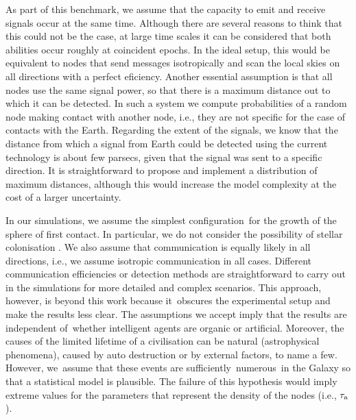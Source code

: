 \documentclass[crop]{CSLB}
\newcommand{\cetis}{nodes}
\begin{document}
As part of this benchmark, we assume that the capacity to emit and receive
signals occur at the same time.
%
Although there are several reasons to think that this could not be the case, at
large time scales it can be considered that both abilities occur roughly at
coincident epochs.
%
In the ideal setup, this would be equivalent to nodes that send messages
isotropically and scan the local skies on all directions with a perfect
eficiency.
%
Another essential assumption is that all \cetis{} use the same signal power, so
that there is a maximum distance out to which it can be detected.
%
In such a system we compute probabilities of a random node making contact with
another node, i.e., they are not specific for the case of contacts with the
Earth.
%
Regarding the extent of the signals, we know that the distance from which a
signal from Earth could be detected using the current technology is about few
parsecs, given that the signal was sent to a specific direction.
%
It is straightforward to propose and implement a distribution of maximum
distances, although this would increase the model complexity at the cost of a
larger uncertainty.



In our simulations, we assume the simplest configuration for the
growth of the sphere of first contact.
%
In particular, we do not consider the
possibility of stellar colonisation
\citep[e.g.][]{newman_galactic_1981, walters_interstellar_1980,
starling_virulence_2013, barlow_galactic_2012, jeong_large_2000,
maccone_mathematical_2011}.
%
We also assume that communication is
equally likely in all directions, i.e., we assume isotropic
communication in all cases.
%
Different communication efficiencies or
detection methods are straightforward to carry out in the simulations
for more detailed and complex scenarios.
%
This approach, however, is
beyond this work because it obscures the experimental setup and make
the results less clear.
%
The assumptions we accept imply that the
results are independent of whether intelligent agents are organic or
artificial.
%
Moreover, the causes of the limited lifetime of a
civilisation can be natural (astrophysical phenomena), caused by auto
destruction or by external factors, to name a few.
%
However, we assume
that these events are sufficiently numerous in the Galaxy so that a
statistical model is plausible. The failure of this hypothesis would
imply extreme values for the parameters that represent the density of
the nodes (i.e., $\tau_{\rm a}$).
\end{document}
